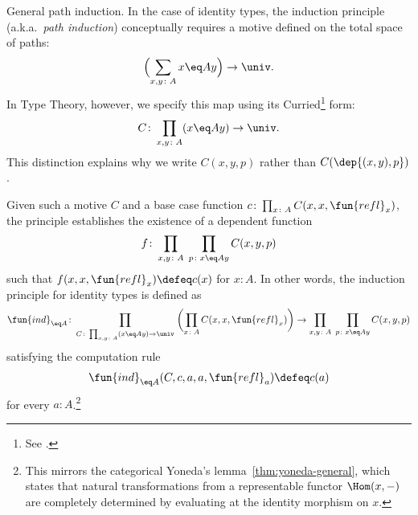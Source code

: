 \begin{lpar}{General path induction.}\label{lpar:path-induction}
    In the case of identity types, the induction principle (a.k.a.~\textsl{path induction}) conceptually requires a motive defined on the total space of paths:
    \[
        \Bigl(\sum_{x,y\colon A}x\eq A y\Bigr)\to\univ.
    \]
    In Type Theory, however, we specify this map using its Curried\footnote{See .} form:
    \[
        C\colon\prod_{x,y\colon A}(x\eq A y)\to\univ.
    \]
    This distinction explains why we write $C(x,y,p)$ rather than $C(\dep{(x,y),p})$.

    Given such a motive $C$ and a base case function $c\colon\prod_{x\colon A}C(x,x,\fun{refl}_x)$, the principle establishes the existence of a dependent function
    \[
        f\colon\prod_{x,y\colon A}\;\prod_{p\colon x\eq Ay}C(x,y,p)
    \]
    such that $f(x,x,\fun{refl}_x)\defeq c(x)$ for $x\colon A$. In other words, the induction principle for identity types is defined as
    \begin{equation}\label{eq:ind=A}
        \fun{ind}_{\eq A}\colon\prod_{C\colon\prod_{x,y\colon A}(x\eq A y)\to\univ}
            \;\biggl(\prod_{x\colon A}C(x,x,\fun{refl}_x)\biggr)
                \to\prod_{x,y\colon A}\;\prod_{p\colon x\eq Ay}C(x,y,p)
    \end{equation}
    satisfying the computation rule
    \[
        \fun{ind}_{\eq A}(C,c,a,a,\fun{refl}_a)\defeq c(a)
    \]
    for every $a\colon A$.\footnote{This mirrors the categorical Yoneda's lemma~\ref{thm:yoneda-general}, which states that natural transformations from a representable functor $\Hom(x,-)$ are completely determined by evaluating at the identity morphism on $x$.}
\end{lpar}


